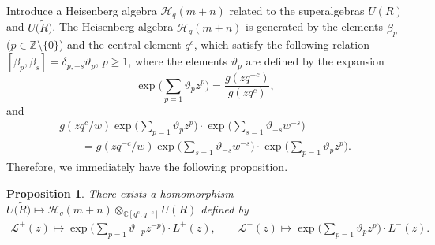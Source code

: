\documentclass[10pt,a4paper]{amsart}
\numberwithin{equation}{section}
\newtheorem{Proposition}[Theorem]{Proposition}
 { \theoremstyle{definition}
\newtheorem{Definition}[Theorem]{Definition}
\newtheorem{Note}[Theorem]{Note}
\newtheorem{Example}[Theorem]{Example}
\newtheorem{Remark}[Theorem]{Remark} }
\begin{document}
Introduce a Heisenberg algebra $\mathcal{H}_q(m+n)$ related to the superalgebras $U(R)$ and $U\bigl(\widetilde{R}\bigr)$. The Heisenberg algebra $\mathcal{H}_q(m+n)$ is generated by the elements $\beta_p$ ($p\in\mathbb{Z}\setminus\{0\}$) and the central element $q^c$, which satisfy the following relation
$ [\beta_p, \beta_s]=\delta_{p,-s}\vartheta_p$, $ p\geq1$,
where the elements $\vartheta_p$ are defined by the expansion
\[
\exp\biggl(\sum_{p=1}\vartheta_pz^p\biggr)=\frac{g(zq^{-c})}{g(zq^c)},
\]
and
\begin{gather*}%
 g(zq^{c}/w) \exp\biggl(\sum_{p=1}\vartheta_p z^p\biggr) \cdot \exp\biggl(\sum_{s=1}\vartheta_{-s}w^{-s}\biggr)\\
 \qquad=g(zq^{-c}/w)\exp\biggl(\sum_{s=1}\vartheta_{-s}w^{-s}\biggr) \cdot \exp\biggl(\sum_{p=1}\vartheta_pz^p\biggr).
\end{gather*}
Therefore, we immediately have the following proposition.
\begin{Proposition}\label{Apr3}
There exists a homomorphism $U\bigl(\widetilde{R}\bigr)\mapsto\mathcal{H}_q(m+n)\otimes_{\mathbb{C}[q^c, q^{-c}]} U(R)$ defined by
\begin{gather*}
\mathcal{L}^+(z)\mapsto \exp\biggl(\sum_{p=1}\vartheta_{-p}z^{-p}\biggr) \cdot L^+(z),\qquad \mathcal{L}^-(z)\mapsto \exp\biggl(\sum_{p=1}\vartheta_{p}z^{p}\biggr) \cdot L^-(z).
\end{gather*}
\end{Proposition}
\end{document}
